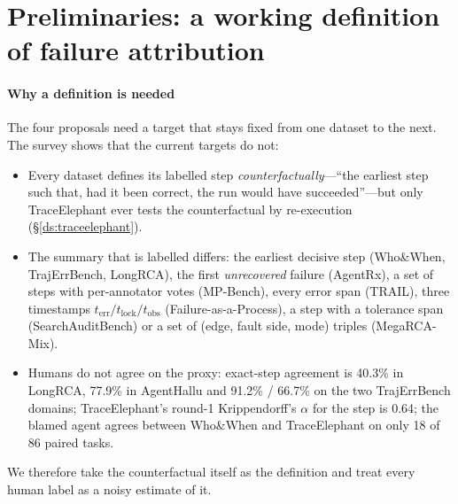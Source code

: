 \section{Preliminaries: a working definition of failure attribution}\label{sec:future:prelim}

\paragraph{Why a definition is needed} The four proposals need a target that stays fixed from one dataset to the next. The survey shows that the current targets do not:
\begin{itemize}[leftmargin=1.1em]
\item Every dataset defines its labelled step \emph{counterfactually}---``the earliest step such that, had it been correct, the run would have succeeded''---but only TraceElephant ever tests the counterfactual by re-execution (\S\ref{ds:traceelephant}).
\item The summary that is labelled differs: the earliest decisive step (Who\&When, TrajErrBench, LongRCA), the first \emph{unrecovered} failure (AgentRx), a set of steps with per-annotator votes (MP-Bench), every error span (TRAIL), three timestamps $t_{\mathrm{err}}/t_{\mathrm{lock}}/t_{\mathrm{obs}}$ (Failure-as-a-Process), a step with a tolerance span (SearchAuditBench) or a set of (edge, fault side, mode) triples (MegaRCA-Mix).
\item Humans do not agree on the proxy: exact-step agreement is 40.3\% in LongRCA, 77.9\% in AgentHallu and 91.2\% / 66.7\% on the two TrajErrBench domains; TraceElephant's round-1 Krippendorff's $\alpha$ for the step is 0.64; the blamed agent agrees between Who\&When and TraceElephant on only 18 of 86 paired tasks.
\end{itemize}
We therefore take the counterfactual itself as the definition and treat every human label as a noisy estimate of it.

